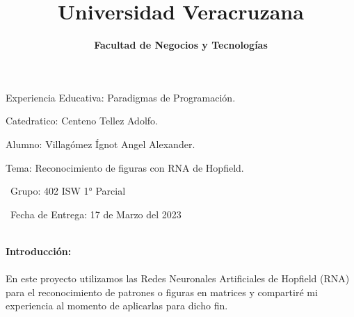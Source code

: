 \documentclass{article}
\title{\textbf{Universidad Veracruzana }}
\date{\textbf{Facultad de Negocios y Tecnologías}}
\begin{document}
\maketitle

\textsf{\Large Experiencia Educativa: Paradigmas de Programación. \\}
 
\maketitle
\textsf{\Large Catedratico: Centeno Tellez Adolfo. \\}

\maketitle
\textsf{\Large Alumno: Villagómez Ígnot Angel Alexander. \\}


\maketitle
\textsf{\Large Tema: Reconocimiento de figuras con RNA de Hopfield. \\}


\maketitle
\textsf{\ Grupo: 402 ISW 1° Parcial \\}
\maketitle
\textsf{\ Fecha de Entrega: 17 de Marzo del 2023 \\}

\newpage
\maketitle
\maketitle
\textsf{\ \\
\textbf{Introducción:}\\
\\
En este proyecto utilizamos las Redes Neuronales Artificiales de Hopfield (RNA) para el reconocimiento de patrones o figuras en matrices y compartiré mi experiencia al momento de aplicarlas para dicho fin. \\}
\\
\end{document}
